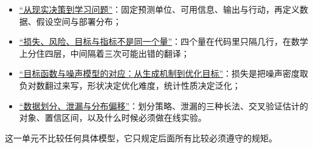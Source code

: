 \begin{itemize}
\tightlist
\item \hyperref[sec:13-Machine-Learning/01-Learning-Problems-and-Evaluation/01]{``从现实决策到学习问题''}：固定预测单位、可用信息、输出与行动，再定义数据、假设空间与部署分布；
\item \hyperref[sec:13-Machine-Learning/01-Learning-Problems-and-Evaluation/02]{``损失、风险、目标与指标不是同一个量''}：四个量在代码里只隔几行，在数学上分住四层，中间隔着三次可能出错的翻译；
\item \hyperref[sec:13-Machine-Learning/01-Learning-Problems-and-Evaluation/03]{``目标函数与噪声模型的对应：从生成机制到优化目标''}：损失是把噪声密度取负对数翻过来写，形状决定优化难度，统计性质决定泛化；
\item \hyperref[sec:13-Machine-Learning/01-Learning-Problems-and-Evaluation/04]{``数据划分、泄漏与分布偏移''}：划分策略、泄漏的三种长法、交叉验证估计的对象、置信区间，以及什么时候必须做在线实验。
\end{itemize}

这一单元不比较任何具体模型，它只规定后面所有比较必须遵守的规矩。
